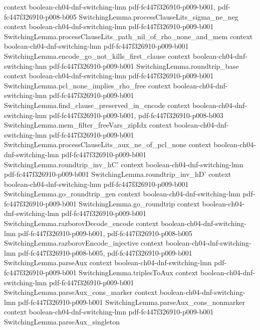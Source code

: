 \begin{theorem}
  {context}
  {boolean-ch04-dnf-switching-lmn}
  {pdf-fc447f326910-p009-b001,
    pdf-fc447f326910-p008-b005}
\proofstep
  {SwitchingLemma.processClauseLits_sigma_ne_neg}
  {context}
  {boolean-ch04-dnf-switching-lmn}
  {pdf-fc447f326910-p009-b001}
\proofstep
  {SwitchingLemma.processClauseLits_path_nil_of_rho_none_and_mem}
  {context}
  {boolean-ch04-dnf-switching-lmn}
  {pdf-fc447f326910-p009-b001}
\proofstep
  {SwitchingLemma.encode_go_not_kills_first_clause}
  {context}
  {boolean-ch04-dnf-switching-lmn}
  {pdf-fc447f326910-p009-b001}
\proofstep
  {SwitchingLemma.roundtrip_base}
  {context}
  {boolean-ch04-dnf-switching-lmn}
  {pdf-fc447f326910-p009-b001}
\proofstep
  {SwitchingLemma.pcl_none_implies_rho_free}
  {context}
  {boolean-ch04-dnf-switching-lmn}
  {pdf-fc447f326910-p009-b001}
\proofstep
  {SwitchingLemma.find_clause_preserved_in_encode}
  {context}
  {boolean-ch04-dnf-switching-lmn}
  {pdf-fc447f326910-p009-b001,
    pdf-fc447f326910-p008-b003}
\proofstep
  {SwitchingLemma.mem_filter_freeVars_zipIdx}
  {context}
  {boolean-ch04-dnf-switching-lmn}
  {pdf-fc447f326910-p009-b001}
\proofstep
  {SwitchingLemma.processClauseLits_aux_ne_of_pcl_none}
  {context}
  {boolean-ch04-dnf-switching-lmn}
  {pdf-fc447f326910-p009-b001}
\proofstep
  {SwitchingLemma.roundtrip_inv_hC'}
  {context}
  {boolean-ch04-dnf-switching-lmn}
  {pdf-fc447f326910-p009-b001}
\proofstep
  {SwitchingLemma.roundtrip_inv_hD'}
  {context}
  {boolean-ch04-dnf-switching-lmn}
  {pdf-fc447f326910-p009-b001}
\proofstep
  {SwitchingLemma.go_roundtrip_gen}
  {context}
  {boolean-ch04-dnf-switching-lmn}
  {pdf-fc447f326910-p009-b001}
\proofstep
  {SwitchingLemma.go_roundtrip}
  {context}
  {boolean-ch04-dnf-switching-lmn}
  {pdf-fc447f326910-p009-b001}
\proofstep
  {SwitchingLemma.razborovDecode_encode}
  {context}
  {boolean-ch04-dnf-switching-lmn}
  {pdf-fc447f326910-p009-b001,
    pdf-fc447f326910-p008-b005}
\proofstep
  {SwitchingLemma.razborovEncode_injective}
  {context}
  {boolean-ch04-dnf-switching-lmn}
  {pdf-fc447f326910-p008-b005,
    pdf-fc447f326910-p009-b001}
\proofstep
  {SwitchingLemma.parseAux}
  {context}
  {boolean-ch04-dnf-switching-lmn}
  {pdf-fc447f326910-p009-b001}
\proofstep
  {SwitchingLemma.triplesToAux}
  {context}
  {boolean-ch04-dnf-switching-lmn}
  {pdf-fc447f326910-p009-b001}
\proofstep
  {SwitchingLemma.parseAux_cons_marker}
  {context}
  {boolean-ch04-dnf-switching-lmn}
  {pdf-fc447f326910-p009-b001}
\proofstep
  {SwitchingLemma.parseAux_cons_nonmarker}
  {context}
  {boolean-ch04-dnf-switching-lmn}
  {pdf-fc447f326910-p009-b001}
\proofstep
  {SwitchingLemma.parseAux_singleton}

\end{theorem}
